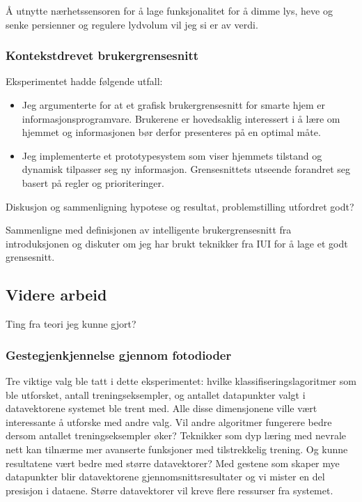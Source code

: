 Å utnytte nærhetssensoren for å lage funksjonalitet for å dimme lys, heve og senke persienner og regulere lydvolum vil jeg si er av verdi.

\subsubsection*{Kontekstdrevet brukergrensesnitt}
Eksperimentet hadde følgende utfall:
\begin{itemize}
\item Jeg argumenterte for at et grafisk brukergrensesnitt for smarte hjem er informasjonsprogramvare. Brukerene er hovedsaklig interessert i å lære om hjemmet og informasjonen bør derfor presenteres på en optimal måte.
\item Jeg implementerte et prototypesystem som viser hjemmets tilstand og dynamisk tilpasser seg ny informasjon. Grensesnittets utseende forandret seg basert på regler og prioriteringer.
\end{itemize}

{\color{blue}Diskusjon og sammenligning hypotese og resultat, problemstilling utfordret godt?

Sammenligne med definisjonen av intelligente brukergrensesnitt fra introduksjonen og diskuter om jeg har brukt teknikker fra IUI for å lage et godt grensesnitt.}

\subsection{Videre arbeid}
{\color{blue}Ting fra teori jeg kunne gjort?}

\subsubsection*{Gestegjenkjennelse gjennom fotodioder}
Tre viktige valg ble tatt i dette eksperimentet: hvilke klassifiseringslagoritmer som ble utforsket, antall treningseksempler, og antallet datapunkter valgt i datavektorene systemet ble trent med. Alle disse dimensjonene ville vært interessante å utforske med andre valg. Vil andre algoritmer fungerere bedre dersom antallet treningseksempler øker? Teknikker som dyp læring med nevrale nett kan tilnærme mer avanserte funksjoner med tilstrekkelig trening. Og kunne resultatene vært bedre med større datavektorer? Med gestene som skaper mye datapunkter blir datavektorene gjennomsnittsresultater og vi mister en del presisjon i dataene. Større datavektorer vil kreve flere ressurser fra systemet.

